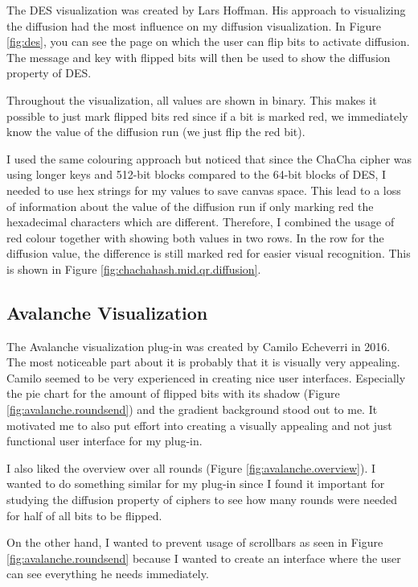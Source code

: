 The DES visualization was created by Lars Hoffman. His approach to visualizing the diffusion had the most influence on my diffusion visualization. In Figure \ref{fig:des}, you can see the page on which the user can flip bits to activate diffusion. The message and key with flipped bits will then be used to show the diffusion property of DES. 

Throughout the visualization, all values are shown in binary. This makes it possible to just mark flipped bits red since if a bit is marked red, we immediately know the value of the diffusion run (we just flip the red bit). 

I used the same colouring approach but noticed that since the ChaCha cipher was using longer keys and 512-bit blocks compared to the 64-bit blocks of DES, I needed to use hex strings for my values to save canvas space. This lead to a loss of information about the value of the diffusion run if only marking red the hexadecimal characters which are different. Therefore, I combined the usage of red colour together with showing both values in two rows. In the row for the diffusion value, the difference is still marked red for easier visual recognition. This is shown in Figure \ref{fig:chachahash.mid.qr.diffusion}.

\subsection{Avalanche Visualization}
\label{sec:avalancheVisualization}

The Avalanche visualization plug-in was created by Camilo Echeverri in 2016. The most noticeable part about it is probably that it is visually very appealing. Camilo seemed to be very experienced in creating nice user interfaces. Especially the pie chart for the amount of flipped bits with its shadow (Figure \ref{fig:avalanche.roundsend}) and the gradient background stood out to me. It motivated me to also put effort into creating a visually appealing and not just functional user interface for my plug-in.

I also liked the overview over all rounds (Figure \ref{fig:avalanche.overview}). I wanted to do something similar for my plug-in since I found it important for studying the diffusion property of ciphers to see how many rounds were needed for half of all bits to be flipped.

On the other hand, I wanted to prevent usage of scrollbars as seen in Figure \ref{fig:avalanche.roundsend} because I wanted to create an interface where the user can see everything he needs immediately.

